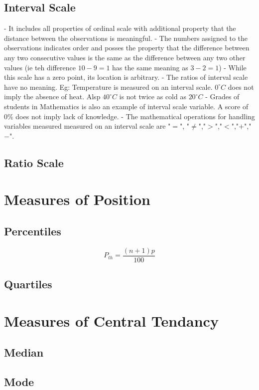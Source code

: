 \documentclass[12pt,a4paper]{article}
\begin{document}
\subsection{Interval Scale}
- It includes all properties of ordinal scale with additional property that the distance between the observations is meaningful.
- The numbers assigned to the observations indicates order and posses the property that the difference between any two consecutive values is the same as the difference between any two other values (ie teh difference $10 - 9 = 1$ has the same meaning as $3 - 2 = 1$)
- While this scale has a zero point, its location is arbitrary.
- The ratios of interval scale have no meaning.
Eg: Temperature is measured on an interval scale. $0^{\circ}C$ does not imply the absence of heat. Alsp $40^{\circ}C$ is not twice as cold as $20^{\circ}C$
- Grades of students in Mathematics is also an example of interval scale variable. A score of $0\%$ does not imply lack of knowledge.
- The mathematical operations for handling variables measured measured on an interval scale are "$=$", "$\neq$","$>$","$<$","$+$","$-$".
\subsection{Ratio Scale}

\section{Measures of Position}

\subsection{Percentiles}
\begin{equation}
    P_{th} = \frac{(n+1)p}{100}
\end{equation}
\subsection{Quartiles}


\section{Measures of Central Tendancy}

\subsection{Median}
\subsection{Mode}
\end{document}
